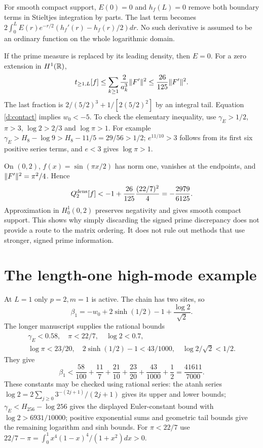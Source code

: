 For smooth compact support, $E(0)=0$ and $h_f(L)=0$ remove both boundary
terms in Stieltjes integration by parts. The last term becomes
$2\int_0^L E(r)e^{-r/2}(h_f'(r)-h_f(r)/2)dr$. No such derivative is
assumed to be an ordinary function on the whole logarithmic domain.

If the prime measure is replaced by its leading density, then $E=0$.
For a zero extension in $H^1(\mathbb R)$,
\[
t_{\ge1,L}[f]\le\sum_{k\ge1}\frac2{a_k^3}\lVert F'\rVert^2
\le\frac{26}{125}\lVert F'\rVert^2.
\]
The last fraction is $2/(5/2)^3+1/[2(5/2)^2]$ by an integral tail.
Equation \eqref{d:contact} implies $w_0<-5$. To check the elementary
inequality, use $\gamma_E>1/2$, $\pi>3$, $\log2>2/3$ and $\log\pi>1$.
For example
$\gamma_E>H_8-\log9>H_8-11/5=29/56>1/2$;
$e^{11/10}>3$ follows from its first six positive series terms,
and $e<3$ gives $\log\pi>1$.

On $(0,2)$, $f(x)=\sin(\pi x/2)$ has norm one, vanishes at the endpoints,
and $\lVert F'\rVert^2=\pi^2/4$. Hence
\[
Q_2^{\rm dens}[f]<-1+\frac{26}{125}\frac{(22/7)^2}{4}
=-\frac{2979}{6125}.
\]
Approximation in $H_0^1(0,2)$ preserves negativity and gives smooth compact
support. This shows why simply discarding the signed prime discrepancy
does not provide a route to the matrix ordering. It does not rule out
methods that use stronger, signed prime information.

\section{The length-one high-mode example}
At $L=1$ only $p=2,m=1$ is active. The chain has two sites, so
\[
\beta_1=-w_0+2\sinh(1/2)-1+\frac{\log2}{\sqrt2}.
\]
The longer manuscript supplies the rational bounds
\[
\begin{gathered}
\gamma_E<0.58,\quad\pi<22/7,\quad\log2<0.7,\\
\log\pi<23/20,\quad2\sinh(1/2)-1<43/1000,\quad
\log2/\sqrt2<1/2.
\end{gathered}
\]
They give
\[
\beta_1<\frac{58}{100}+\frac{11}{7}+\frac{21}{10}
+\frac{23}{20}+\frac{43}{1000}+\frac12=\frac{41611}{7000}.
\]
These constants may be checked using rational series: the atanh series
$\log2=2\sum_{j\ge0}3^{-(2j+1)}/(2j+1)$ gives its upper and lower bounds;
$\gamma_E<H_{256}-\log256$ gives the displayed Euler-constant bound
with $\log2>6931/10000$; positive exponential sums and geometric tail
bounds give the remaining logarithm and sinh bounds. For $\pi<22/7$ use
$22/7-\pi=\int_0^1x^4(1-x)^4/(1+x^2)dx>0$.

